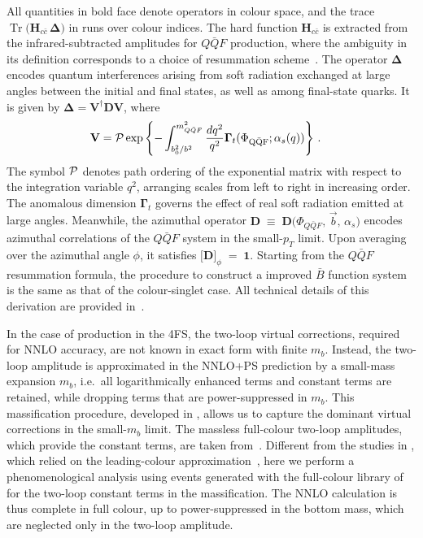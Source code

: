 \documentclass[11pt,a4paper]{article}
\DeclareMathOperator{\Tr}{Tr}
\begin{document}
All quantities in bold face denote operators in colour space, and the trace $\Tr\bigl({\mathbf H}_{c\bar{c}}\,{\mathbf \Delta}\bigr)$
in  runs over colour indices.  The hard function ${\mathbf H}_{c\bar{c}}$ is extracted from the infrared-subtracted amplitudes for $Q\bar{Q}F$ production, 
where the ambiguity in its definition corresponds to a choice of resummation scheme~\cite{Bozzi:2005wk}.  The operator ${\mathbf \Delta}$ encodes quantum interferences arising from soft radiation exchanged at large angles between the initial and final states, as well as among final-state quarks. It is given by ${\mathbf \Delta}={\mathbf V}^\dagger{\mathbf D}{\mathbf V}$, where
\begin{align}
\label{eq:soft}
{\mathbf V} &= {\cal
  P}\exp\left\{-\int_{b_0^2/b^2}^{m_{Q\bar{Q}F}^2}\frac{dq^2}{q^2}{\mathbf
  \Gamma}_t(\Phi_{\rm Q\bar{Q}F};\alpha_s(q))\right\}\,.%
\end{align}
The symbol ${\cal P}$ denotes path ordering of the exponential matrix with respect to the integration variable $q^{2}$, arranging scales from left to right in increasing order.  The anomalous dimension $\mathbf{\Gamma}_{t}$ governs the effect of real soft radiation emitted at large angles.  Meanwhile, the azimuthal operator $\mathbf{D} \;\equiv\; \mathbf{D}\bigl(\Phi_{Q\bar{Q}F},\,\vec{b},\,\alpha_{s}\bigr)$
encodes azimuthal correlations of the $Q\bar{Q}F$ system in the small-$p_{T}$ limit.  Upon averaging over the azimuthal angle $\phi$, it satisfies
$\bigl[\mathbf{D}\bigr]_{\phi} \;=\; \mathbf{1}$.
Starting from the $Q\bar Q F$ resummation formula, the procedure to construct a \minnlo{} improved $\bar{B}$ function system is the same as that of the colour-singlet case.
All technical details of this derivation are provided in~.

In the case of \bbH{} production in the 4FS, the two-loop virtual corrections, required for NNLO accuracy,
are not known in exact form with finite $m_b$. Instead, the two-loop amplitude is approximated in the NNLO+PS
prediction by a small-mass expansion $m_b$, i.e.\ all logarithmically enhanced terms and constant terms are retained,
while dropping terms that are power-suppressed in $m_b$. 
This massification procedure, developed in , allows us to capture the dominant 
virtual corrections in the small-$m_b$ limit. The massless full-colour two-loop amplitudes, which provide the constant
terms, are taken from~. Different from the studies in , which relied on 
the leading-colour approximation~\cite{badger:2021ega}, here we perform a phenomenological analysis using events 
generated with the full-colour library of~ for the two-loop constant terms in the massification. 
The NNLO calculation is thus complete in full colour, up to power-suppressed in the bottom mass, which are neglected
only in the two-loop amplitude.
\end{document}
